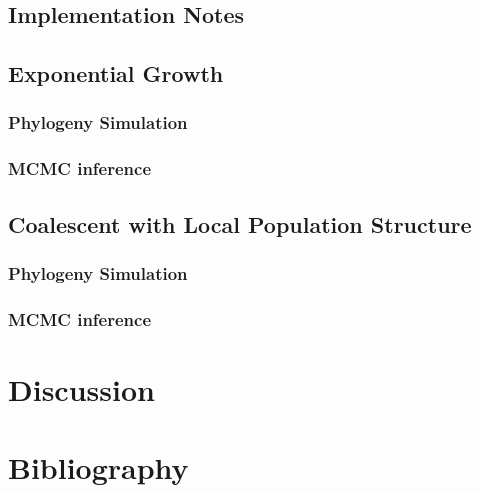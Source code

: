 \documentclass{report}
\theoremstyle{definition}
\begin{document}
\section{Implementation Notes}
\section{Exponential Growth}
\subsection{Phylogeny Simulation}
\subsection{MCMC inference}
\section{Coalescent with Local Population Structure}
\subsection{Phylogeny Simulation}
\subsection{MCMC inference}
\chapter{Discussion}
\chapter{Bibliography}
\printbibliography
\end{document}

